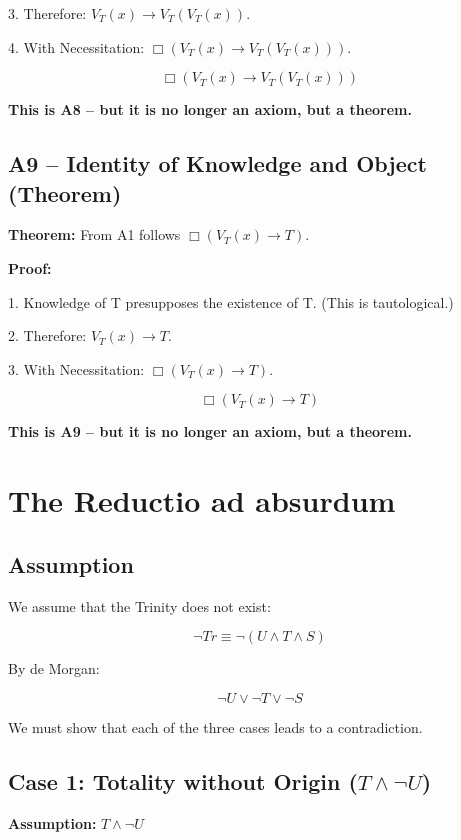 \documentclass[
]{article}
\begin{document}
3. Therefore: \(V_T(x) \rightarrow V_T(V_T(x))\).

4. With Necessitation: \(\Box(V_T(x) \rightarrow V_T(V_T(x)))\).

\[
\boxed{\Box(V_T(x) \rightarrow V_T(V_T(x)))}
\]

\textbf{This is A8 – but it is no longer an axiom, but a theorem.}

\subsection{A9 – Identity of Knowledge and Object (Theorem)}\label{a9-identity-of-knowledge-and-object-theorem}

\textbf{Theorem:} From A1 follows \(\Box(V_T(x) \rightarrow T)\).

\textbf{Proof:}

1. Knowledge of T presupposes the existence of T. (This is tautological.)

2. Therefore: \(V_T(x) \rightarrow T\).

3. With Necessitation: \(\Box(V_T(x) \rightarrow T)\).

\[
\boxed{\Box(V_T(x) \rightarrow T)}
\]

\textbf{This is A9 – but it is no longer an axiom, but a theorem.}

\section{The Reductio ad absurdum}\label{the-reductio-ad-absurdum}

\subsection{Assumption}\label{assumption}

We assume that the Trinity does not exist:

\[
\neg Tr \equiv \neg(U \land T \land S)
\]

By de Morgan:

\[
\neg U \lor \neg T \lor \neg S
\]

We must show that each of the three cases leads to a contradiction.

\subsection{Case 1: Totality without Origin (\(T \land \neg U\))}\label{case-1-totality-without-origin-t-land-neg-u}

\textbf{Assumption:} \(T \land \neg U\)
\end{document}
